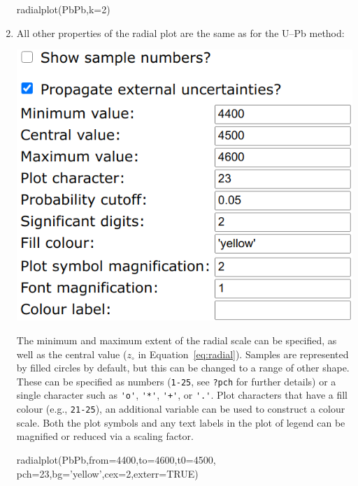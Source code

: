 \begin{refsection}
\begin{enumerate}
\begin{console}
radialplot(PbPb,k=2)
\end{console}

\item All other properties of the radial plot are the same as for the
  U--Pb method:

\noindent\begin{minipage}[t]{.5\linewidth}
\strut\vspace*{-\baselineskip}\newline
\includegraphics[width=\linewidth]{../figures/PbPbRadialOtherProperties.png}
\end{minipage}
\begin{minipage}[t]{.5\linewidth}
  The minimum and maximum extent of the radial scale can be specified,
  as well as the central value ($z_\circ$ in
  Equation~\ref{eq:radial}). Samples are represented by filled circles
  by default, but this can be changed to a range of other shape. These
  can be specified as numbers (\texttt{1-25}, see \texttt{?pch} for
  further details) or a single character such as \verb|'o'|,
  \verb|'*'|, \verb|'+'|, or \verb|'.'|. Plot characters that have a
    fill colour (e.g., \texttt{21-25}), an additional variable can be
    used to construct a colour scale. Both the plot symbols and any
    text labels in the plot of legend can be magnified or reduced via
    a scaling factor.
\end{minipage}

\begin{script}
radialplot(PbPb,from=4400,to=4600,t0=4500,
           pch=23,bg='yellow',cex=2,exterr=TRUE)
\end{script}


\end{enumerate}
\end{refsection}

